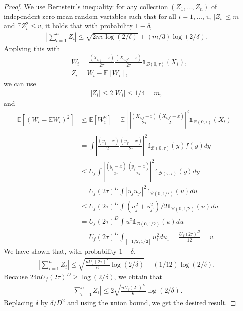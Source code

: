 \begin{proof}
We use Bernstein’s inequality: for any collection $(Z_1,\ldots, Z_n)$ of independent zero-mean random variables such that for all $i=1,\ldots, n$, $|Z_i| \leq m$ and $\mathbb E Z_i^2 \leq v $, it holds that with probability $1-\delta$,
\begin{align*}
\left| \sum_{i=1} ^n  Z_i  \right| \leq  \sqrt {2 n v\log(2/\delta) } + (m/3) \log(2/\delta) .
\end{align*}  
Applying this with 
\begin{align*}
&W_ i  =  \frac{(X_{i,j} -x) }{2\tau}  \frac{(X_{i,j'} -x)}{2\tau} \mathds{1} _{\mathcal B (0,\tau) }  (X_i) , \\
&Z_i = W_i - \mathbb E [W_i],
\end{align*}
we can use
\begin{align*}
|Z_i| \leq 2| W_i| \leq  1/4 = m,
\end{align*}
and 
\begin{align*}
\mathbb E [ (W_i- \mathbb E W_i  )^2]& \leq \mathbb E [W_i^2]  = \mathbb E \left[  \left| \frac{(X_{i,j} -x)}{2\tau} \frac{(X_{i,j'} -x)}{2\tau} \right|^2 \mathds{1} _{\mathcal B (0,\tau) }(X_i) \right]\\
& = \int   \left|  \frac{(y_{j} -x)}{2\tau} \frac{( y_{j'} -x)}{2\tau} \right|^2 \mathds{1} _{\mathcal B (0,\tau) }(y)  f( y ) dy \\
& \leq  U_f  \int   \left|  \frac{(y_{j} -x)}{2\tau} \frac{( y_{j'} -x)}{2\tau} \right|^2 \mathds{1} _{\mathcal B (0,\tau) }(y)  dy \\
& = U_f(2\tau ) ^{D}  \int   \left| u_j  u_{j'}  \right|^2 \mathds{1} _{\mathcal B (0,1/2) }(u) du\\
& \leq U_f(2\tau ) ^{D}  \int    (u_j ^2 +   u_{j'}^2 )/2  \mathds{1} _{\mathcal B (0,1/2) }(u) du\\
&  =  U_f(2\tau ) ^{D}  \int    u_1 ^2   \mathds{1}_{\mathcal B (0,1/2) }(u) du\\
& = U_f(2\tau ) ^{D}  \int_{[-1/2,1/2]  }    u_1^2   du_1   =  \frac{ U_f (2\tau ) ^{D}}{12}  = v.
\end{align*}
We have shown that, with probability $1-\delta$,
\begin{align*}
\left| \sum_{i=1} ^n  Z_i  \right| \leq  \sqrt {  \frac{ nU_f  (2\tau ) ^{D}}{6}  \log(2/\delta) } + (1/12) \log(2/\delta) .
\end{align*}
Because $ 24 n U_f (2\tau ) ^{D}  \geq   \log(2/\delta )  $, we obtain that  
\begin{align*}
\left| \sum_{i=1} ^n  Z_i  \right| \leq  2 \sqrt {  \frac{ n U_f (2\tau ) ^{D}}{6}  \log(2/\delta) } .
\end{align*}
Replacing $\delta$ by $\delta / D^2$ and using the union bound, we get the desired result.
\end{proof}

